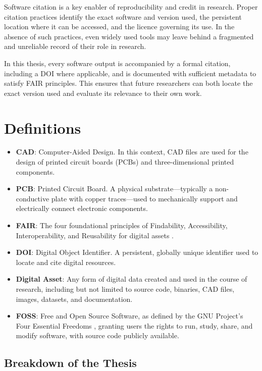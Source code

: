 Software citation is a key enabler of reproducibility and credit in research. Proper citation practices identify the exact software and version used, the persistent location where it can be accessed, and the licence governing its use. In the absence of such practices, even widely used tools may leave behind a fragmented and unreliable record of their role in research.

In this thesis, every software output is accompanied by a formal citation, including a DOI where applicable, and is documented with sufficient metadata to satisfy FAIR principles. This ensures that future researchers can both locate the exact version used and evaluate its relevance to their own work.

\section{Definitions}

\begin{itemize}
    \item \textbf{CAD}: Computer-Aided Design. In this context, CAD files are used for the design of printed circuit boards (PCBs) and three-dimensional printed components.
    \item \textbf{PCB}: Printed Circuit Board. A physical substrate—typically a non-conductive plate with copper traces—used to mechanically support and electrically connect electronic components.
    \item \textbf{FAIR}: The four foundational principles of Findability, Accessibility, Interoperability, and Reusability for digital assets \cite{wilkinson_fair_2016}.
    \item \textbf{DOI}: Digital Object Identifier. A persistent, globally unique identifier used to locate and cite digital resources.
    \item \textbf{Digital Asset}: Any form of digital data created and used in the course of research, including but not limited to source code, binaries, CAD files, images, datasets, and documentation.
    \item \textbf{FOSS}: Free and Open Source Software, as defined by the GNU Project’s Four Essential Freedoms \cite{gnu_philosophy_2025}, granting users the rights to run, study, share, and modify software, with source code publicly available.
\end{itemize}

\subsection{Breakdown of the Thesis}

